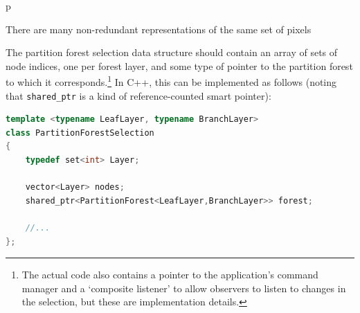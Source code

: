 \begin{stusubfig}{p}
	\hspace{4mm}%
	\hspace{4mm}%
\caption{There are many non-redundant representations of the same set of pixels}
\label{fig:ipfs-selection-multiplerepresentations}
\end{stusubfig}

The partition forest selection data structure should contain an array of sets of node indices, one per forest layer, and some type of pointer to the partition forest to which it corresponds.\footnote{The actual code also contains a pointer to the application's command manager and a `composite listener' to allow observers to listen to changes in the selection, but these are implementation details.} In C++, this can be implemented as follows (noting that \texttt{shared_ptr} is a kind of reference-counted smart pointer):

\begin{lstlisting}[style=Default,language=C++]
template <typename LeafLayer, typename BranchLayer>
class PartitionForestSelection
{
	typedef set<int> Layer;

	vector<Layer> nodes;
	shared_ptr<PartitionForest<LeafLayer,BranchLayer>> forest;

	//...
};
\end{lstlisting}


